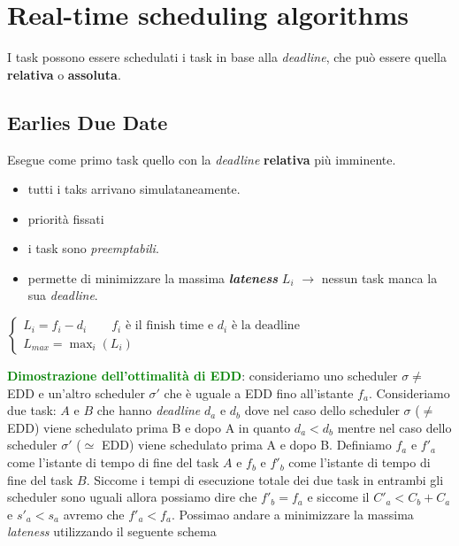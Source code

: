 \chapter{Real-time scheduling algorithms}
I task possono essere schedulati i task in base alla \textit{deadline}, che può essere quella \textbf{relativa} o \textbf{assoluta}.

\section{Earlies Due Date}
Esegue come primo task quello con la \textit{deadline} \textbf{relativa} più imminente.
\begin{itemize}
    \item tutti i taks arrivano simulataneamente.
    \item priorità fissati\item i task sono \textit{preemptabili}.
    \item permette di minimizzare la massima \textbf{\textit{lateness}} $L_i$ $\rightarrow$ nessun task manca la sua \textit{deadline}.
\end{itemize}
\begin{center}
    \begin{math}
        \begin{cases}
            L_i = f_i - d_i \qquad f_i \text{ è il finish time e } d_i \text{ è la deadline} \\
            L_{max} = \max_i(L_i)
        \end{cases}
    \end{math}
\end{center}
\textcolor{green}{\textbf{Dimostrazione dell'ottimalità di EDD}}: consideriamo uno scheduler $\sigma \neq$ EDD e un'altro scheduler $\sigma'$ che è uguale a EDD fino all'istante $f_a$.
Consideriamo due task: $A$ e $B$ che hanno \textit{deadline} $d_a$ e $d_b$ dove nel caso dello scheduler $\sigma$ ($\neq$ EDD) viene schedulato prima B e dopo A in quanto $d_a < d_b$ mentre nel caso dello scheduler $\sigma'$ ($\simeq$ EDD) viene schedulato prima A e dopo B. Definiamo $f_a$ e $f'_a$ come l'istante di tempo di fine del task $A$ e $f_b$ e $f'_b$ come l'istante di tempo di fine del task $B$. Siccome i tempi di esecuzione totale dei due task in entrambi gli scheduler sono uguali allora possiamo dire che $f'_b = f_a$ e siccome il $C'_a < C_b + C_a$ e $s'_a < s_a$ avremo che $f'_a < f_a$. Possimao andare a minimizzare la massima \textit{lateness} utilizzando il seguente schema
